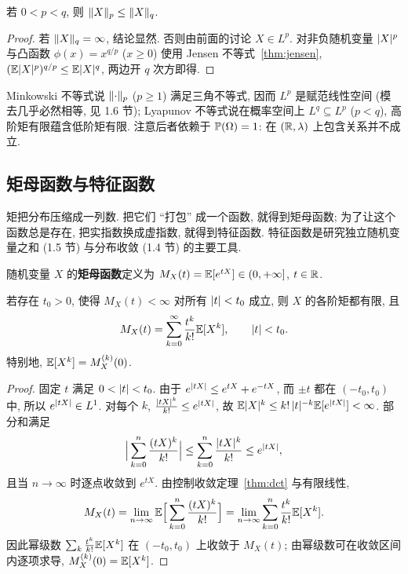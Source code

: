\begin{corollary}\label{cor:lyapunov}
若 $0<p<q$, 则 $\norm{X}_p\le\norm{X}_q$.
\end{corollary}

\begin{proof}
若 $\norm{X}_q=\infty$, 结论显然. 否则由前面的讨论 $X\in L^p$. 对非负随机变量 $\abs{X}^p$ 与凸函数 $\phi(x)=x^{q/p}$ ($x\ge0$) 使用 Jensen 不等式~\ref{thm:jensen},
$(\E\abs{X}^p)^{q/p}\le\E\abs{X}^q$, 两边开 $q$ 次方即得.
\end{proof}

\begin{intuition}
Minkowski 不等式说 $\norm{\cdot}_p$ ($p\ge1$) 满足三角不等式, 因而 $L^p$ 是赋范线性空间 (模去几乎必然相等, 见 1.6 节); Lyapunov 不等式说在概率空间上 $L^q\subseteq L^p$ ($p<q$), 高阶矩有限蕴含低阶矩有限. 注意后者依赖于 $\P(\Omega)=1$: 在 $(\R,\lambda)$ 上包含关系并不成立.
\end{intuition}

\subsection{矩母函数与特征函数}

矩把分布压缩成一列数. 把它们 ``打包'' 成一个函数, 就得到矩母函数; 为了让这个函数总是存在, 把实指数换成虚指数, 就得到特征函数. 特征函数是研究独立随机变量之和 (1.5 节) 与分布收敛 (1.4 节) 的主要工具.

\begin{definition}[矩母函数]\label{def:mgf}
随机变量 $X$ 的\textbf{矩母函数}定义为 $M_X(t)=\E[e^{tX}]\in(0,+\infty]$, $t\in\R$.
\end{definition}

\begin{theorem}\label{thm:mgf-moments}
若存在 $t_0>0$, 使得 $M_X(t)<\infty$ 对所有 $\abs{t}<t_0$ 成立, 则 $X$ 的各阶矩都有限, 且
\[
M_X(t)=\sum_{k=0}^\infty\frac{t^k}{k!}\E[X^k],\qquad \abs{t}<t_0.
\]
特别地, $\E[X^k]=M_X^{(k)}(0)$.
\end{theorem}

\begin{proof}
固定 $t$ 满足 $0<\abs{t}<t_0$. 由于 $e^{\abs{tX}}\le e^{tX}+e^{-tX}$, 而 $\pm t$ 都在 $(-t_0,t_0)$ 中, 所以 $e^{\abs{tX}}\in L^1$. 对每个 $k$, $\frac{\abs{tX}^k}{k!}\le e^{\abs{tX}}$, 故 $\E\abs{X}^k\le k!\,\abs{t}^{-k}\E[e^{\abs{tX}}]<\infty$. 部分和满足
\[
\Big|\sum_{k=0}^n\frac{(tX)^k}{k!}\Big|\le\sum_{k=0}^n\frac{\abs{tX}^k}{k!}\le e^{\abs{tX}},
\]
且当 $n\to\infty$ 时逐点收敛到 $e^{tX}$. 由控制收敛定理~\ref{thm:dct} 与有限线性,
\[
M_X(t)=\lim_{n\to\infty}\E\Big[\sum_{k=0}^n\frac{(tX)^k}{k!}\Big]=\lim_{n\to\infty}\sum_{k=0}^n\frac{t^k}{k!}\E[X^k].
\]
因此幂级数 $\sum_k\frac{t^k}{k!}\E[X^k]$ 在 $(-t_0,t_0)$ 上收敛于 $M_X(t)$; 由幂级数可在收敛区间内逐项求导, $M_X^{(k)}(0)=\E[X^k]$.
\end{proof}

